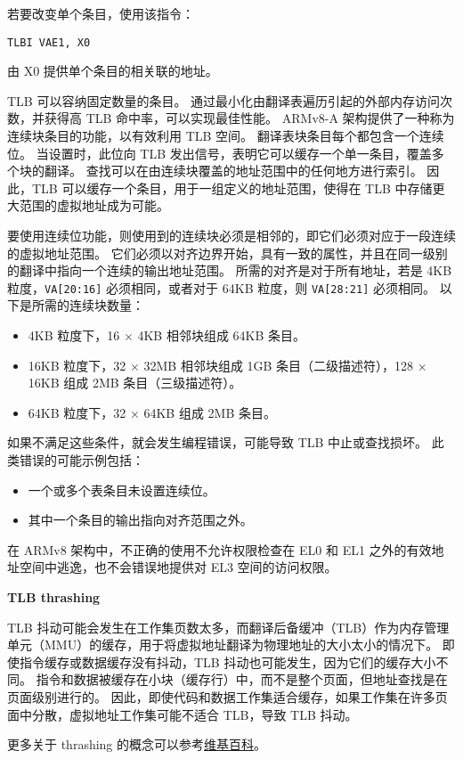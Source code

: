 若要改变单个条目，使用该指令：

\lstinline!TLBI VAE1, X0!

由 X0 提供单个条目的相关联的地址。

TLB 可以容纳固定数量的条目。
通过最小化由翻译表遍历引起的外部内存访问次数，并获得高 TLB 命中率，可以实现最佳性能。
ARMv8-A 架构提供了一种称为连续块条目的功能，以有效利用 TLB 空间。
翻译表块条目每个都包含一个连续位。
当设置时，此位向 TLB 发出信号，表明它可以缓存一个单一条目，覆盖多个块的翻译。
查找可以在由连续块覆盖的地址范围中的任何地方进行索引。
因此，TLB 可以缓存一个条目，用于一组定义的地址范围，使得在 TLB 中存储更大范围的虚拟地址成为可能。

要使用连续位功能，则使用到的连续块必须是相邻的，即它们必须对应于一段连续的虚拟地址范围。
它们必须以对齐边界开始，具有一致的属性，并且在同一级别的翻译中指向一个连续的输出地址范围。
所需的对齐是对于所有地址，若是 4KB 粒度，\lstinline!VA[20:16]! 必须相同，或者对于 64KB 粒度，则 \lstinline!VA[28:21]! 必须相同。
以下是所需的连续块数量：

\begin{itemize}
  \item 4KB 粒度下，16 × 4KB 相邻块组成 64KB 条目。
  \item 16KB 粒度下，32 × 32MB 相邻块组成 1GB 条目（二级描述符），128 × 16KB 组成 2MB 条目（三级描述符）。
  \item 64KB 粒度下，32 × 64KB 组成 2MB 条目。
\end{itemize}

如果不满足这些条件，就会发生编程错误，可能导致 TLB 中止或查找损坏。
此类错误的可能示例包括：

\begin{itemize}
  \item 一个或多个表条目未设置连续位。
  \item 其中一个条目的输出指向对齐范围之外。
\end{itemize}

在 ARMv8 架构中，不正确的使用不允许权限检查在 EL0 和 EL1 之外的有效地址空间中逃逸，也不会错误地提供对 EL3 空间的访问权限。

\begin{Tcbox}[title={扩展}]
\textbf{TLB thrashing}

  TLB 抖动可能会发生在工作集页数太多，而翻译后备缓冲（TLB）作为内存管理单元（MMU）的缓存，用于将虚拟地址翻译为物理地址的大小太小的情况下。
  即使指令缓存或数据缓存没有抖动，TLB 抖动也可能发生，因为它们的缓存大小不同。
  指令和数据被缓存在小块（缓存行）中，而不是整个页面，但地址查找是在页面级别进行的。
  因此，即使代码和数据工作集适合缓存，如果工作集在许多页面中分散，虚拟地址工作集可能不适合 TLB，导致 TLB 抖动。

  更多关于 thrashing 的概念可以参考\href{https://en.wikipedia.org/wiki/Thrashing_(computer_science)}{维基百科}。
\end{Tcbox}

